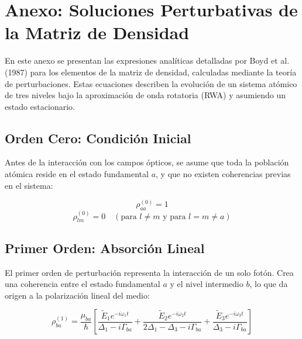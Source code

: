 \documentclass[12pt,a4paper]{article}
\begin{document}



\newpage
\appendix
\section{Anexo: Soluciones Perturbativas de la Matriz de Densidad}

En este anexo se presentan las expresiones analíticas detalladas por Boyd et al. (1987) para los elementos de la matriz de densidad, calculadas mediante la teoría de perturbaciones. Estas ecuaciones describen la evolución de un sistema atómico de tres niveles bajo la aproximación de onda rotatoria (RWA) y asumiendo un estado estacionario.

\subsection*{Orden Cero: Condición Inicial}
Antes de la interacción con los campos ópticos, se asume que toda la población atómica reside en el estado fundamental $a$, y que no existen coherencias previas en el sistema:

\begin{equation}
\rho_{aa}^{(0)} = 1 \tag{1a}
\end{equation}
\begin{equation}
\rho_{lm}^{(0)} = 0 \quad (\text{para } l \neq m \text{ y para } l = m \neq a) \tag{1b}
\end{equation}

\subsection*{Primer Orden: Absorción Lineal}
El primer orden de perturbación representa la interacción de un solo fotón. Crea una coherencia entre el estado fundamental $a$ y el nivel intermedio $b$, lo que da origen a la polarización lineal del medio:

\begin{equation}
\rho_{ba}^{(1)} = \frac{\mu_{ba}}{\hbar} \left[ \frac{\tilde{E}_1 e^{-i\omega_1 t}}{\Delta_1 - i\Gamma_{ba}} + \frac{\tilde{E}_2 e^{-i\omega_2 t}}{2\Delta_1 - \Delta_3 - i\Gamma_{ba}} + \frac{\tilde{E}_3 e^{-i\omega_3 t}}{\Delta_3 - i\Gamma_{ba}} \right] \tag{2}
\end{equation}
\end{document}
